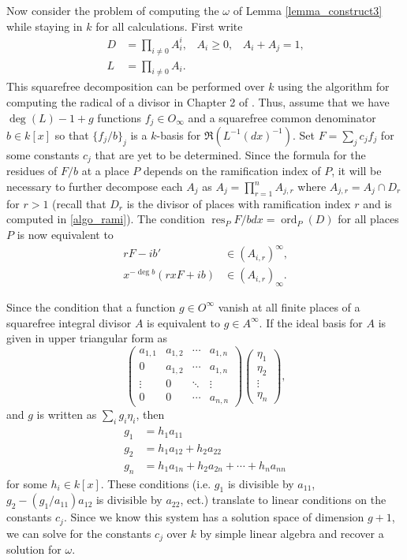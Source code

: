 \documentclass[12pt,reqno]{amsart}
\numberwithin{equation}{section}
\newcommand{\op}[1]  { \operatorname{ #1 }}
\newcommand{\goR}[0]  { \mathfrak{R}}
\begin{document}
Now consider the problem of computing the $\omega$ of Lemma \ref{lemma_construct3} while staying in $k$ for all calculations. First write
\begin{align*}
 D &= \prod_{i \ne 0} A_i ^i \text{,} \quad A_i \ge 0\text{,} \quad A_i+A_j=1\text{,}\\
 L &= \prod_{i \ne 0} A_i\text{.}
\end{align*}
This squarefree decomposition can be performed over $k$ using the algorithm for computing the radical of a divisor in Chapter 2 of \cite{trager}. Thus, assume that we have $\op{deg}(L)-1+g$ functions $f_j \in O_{\infty}$ and a squarefree common denominator $b \in k[x]$ so that $\{f_j/b\}_{j}$ is a $k$-basis for $\goR(L^{-1} (dx)^{-1})$. Set $F = \sum_{j} c_j f_j$ for some constants $c_j$ that are yet to be determined. Since the formula for the residues of $F/b$ at a place $P$ depends on the ramification index of $P$, it will be necessary to further decompose each $A_j$ as $A_j = \prod_{r=1}^{n} A_{j,r}$ where $A_{j,r} = A_j \cap D_r$ for $r>1$ (recall that $D_r$ is the divisor of places with ramification index $r$ and is computed in \ref{algo_rami}). The condition $\op{res}_{P} F/b dx = \op{ord}_P(D)$ for all places $P$ is now equivalent to
\begin{align*}
 r F - i b' &\in (A_{i,r})^{\infty}\text{,}\\
 x^{-\op{deg} b}(r x F + i b) &\in (A_{i,r})_{\infty}\text{.}
\end{align*}

Since the condition that a function $g \in O^{\infty}$ vanish at all finite places of a squarefree integral divisor $A$ is equivalent to $g \in A^{\infty}$. If the ideal basis for $A$ is given in upper triangular form as
\begin{equation*}
\left(
 \begin{array}{cccc}
  a_{1,1} & a_{1,2} & \cdots & a_{1,n}\\
  0 & a_{1,2} & \cdots & a_{1,n}\\
  \vdots & 0 & \ddots & \vdots\\
  0 & 0 & \cdots & a_{n,n}
 \end{array}
\right) \left(
\begin{array}{c}
  \eta_1\\
  \eta_2\\
  \vdots\\
  \eta_n
 \end{array}
\right)\text{,}
\end{equation*}
and $g$ is written as $\sum_i g_i \eta_i$, then
\begin{align*}
g_1 &= h_1 a_{11}\\
g_2 &= h_1 a_{12} + h_2 a_{22}\\
g_n &= h_1 a_{1n} + h_2 a_{2n}+ \cdots + h_n a_{nn}
\end{align*}
for some $h_i \in k[x]$. These conditions (i.e. $g_1$ is divisible by $a_{11}$, $g_2-(g_1/a_{11}) a_{12}$ is divisible by $a_{22}$, ect.) translate to linear conditions on the constants $c_j$. Since we know this system has a solution space of dimension $g+1$, we can solve for the constants $c_j$ over $k$ by simple linear algebra and recover a solution for $\omega$.
\end{document}
